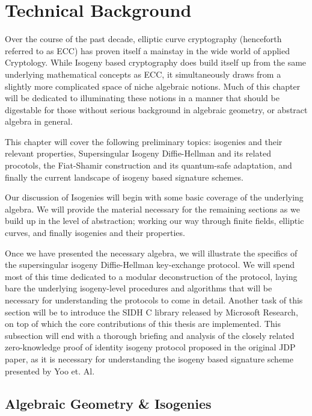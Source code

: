\chapter{Technical Background}

Over the course of the past decade, elliptic curve cryptography (henceforth referred to as ECC) has proven itself a mainstay in the wide world of applied Cryptology. While Isogeny based cryptography does build itself up from the same underlying mathematical concepts as ECC, it simultaneously draws from a slightly more complicated space of niche algebraic notions. Much of this chapter will be dedicated to illuminating these notions in a manner that should be digestable for those without serious background in algebraic geometry, or abstract algebra in general.

This chapter will cover the following preliminary topics: isogenies and their relevant properties, Supersingular Isogeny Diffie-Hellman and its related procotols, the Fiat-Shamir construction and its quantum-safe adaptation, and finally the current landscape of isogeny based signature schemes.

Our discussion of Isogenies will begin with some basic coverage of the underlying algebra. We will provide the material necessary for the remaining sections as we build up in the level of abstraction; working our way through finite fields, elliptic curves, and finally isogenies and their properties.

Once we have presented the necessary algebra, we will illustrate the specifics of the supersingular isogeny Diffie-Hellman key-exchange protocol. We will spend most of this time dedicated to a modular deconstruction of the protocol, laying bare the underlying isogeny-level procedures and algorithms that will be necessary for understanding the protocols to come in detail. Another task of this section will be to introduce the SIDH C library released by Microsoft Research, on top of which the core contributions of this thesis are implemented. This subsection will end with a thorough briefing and analysis of the closely related zero-knowledge proof of identity isogeny protocol proposed in the original JDP paper, as it is necessary for understanding the isogeny based signature scheme presented by Yoo et. Al.\\

\section{Algebraic Geometry \& Isogenies}

